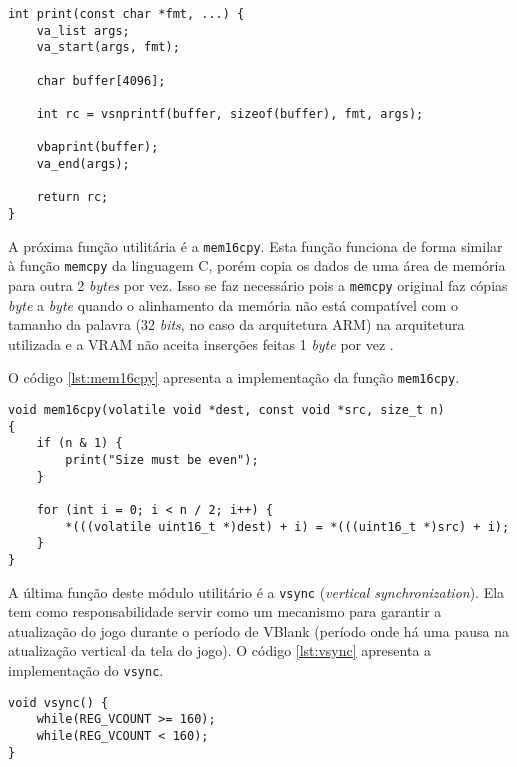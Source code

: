 \begin{lstlisting}[caption={Implementação da função \texttt{print}},label={lst:utilsprint}]
int print(const char *fmt, ...) {
    va_list args;
    va_start(args, fmt);

    char buffer[4096];

    int rc = vsnprintf(buffer, sizeof(buffer), fmt, args);

    vbaprint(buffer);
    va_end(args);

    return rc;
}
\end{lstlisting}

A próxima função utilitária é a \texttt{mem16cpy}. Esta função funciona de forma similar à função \texttt{memcpy} da linguagem C, porém copia os dados de uma área de memória para outra 2 \textit{bytes} por vez. Isso se faz necessário pois a \texttt{memcpy} original faz cópias \textit{byte} a \textit{byte} quando o alinhamento da memória não está compatível com o tamanho da palavra (32 \textit{bits}, no caso da arquitetura ARM) na arquitetura utilizada e a VRAM não aceita inserções feitas 1 \textit{byte} por vez \cite{coranac}.

O código \ref{lst:mem16cpy} apresenta a implementação da função \texttt{mem16cpy}.

\begin{lstlisting}[caption={Implementação da função \texttt{mem16cpy}},label={lst:mem16cpy}]
void mem16cpy(volatile void *dest, const void *src, size_t n)
{
    if (n & 1) {
        print("Size must be even");
    }

    for (int i = 0; i < n / 2; i++) {
        *(((volatile uint16_t *)dest) + i) = *(((uint16_t *)src) + i);
    }
}
\end{lstlisting}

A última função deste módulo utilitário é a \texttt{vsync} (\textit{vertical synchronization}). Ela tem como responsabilidade servir como um mecanismo para garantir a atualização do jogo durante o período de VBlank (período onde há uma pausa na atualização vertical da tela do jogo). O código \ref{lst:vsync} apresenta a implementação do \texttt{vsync}.

\begin{lstlisting}[caption={Implementação da função \texttt{vsync}},label={lst:vsync}]
void vsync() {
    while(REG_VCOUNT >= 160);
    while(REG_VCOUNT < 160);
}
\end{lstlisting}
